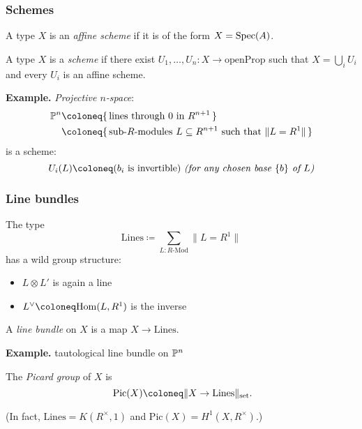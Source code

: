 \documentclass{beamer}
\begin{document}
\begin{frame}
  \frametitle{Schemes}

  A type $X$ is an \emph{affine scheme} if
  it is of the form $X = \operatorname{Spec}(A)$.

  \vspace{5mm}
  A type $X$ is a \emph{scheme} if
  there exist $U_1, \dots, U_n : X \to \mathrm{openProp}$
  such that $X = \bigcup_i U_i$
  and every $U_i$ is an affine scheme.

  \pause
  \vspace{5mm}
  \textbf{Example.}
  \emph{Projective $n$-space}:
  \begin{align*}
    \bP^n
    &\coloneq \{\,\text{lines through $0$ in $R^{n+1}$}\,\} \\
    &\coloneq \{\,\text{sub-$R$-modules $L \subseteq R^{n+1}$ such that $\lVert L = R^1 \rVert$}\,\}
  \end{align*}
  is a scheme:
  \[
    U_i(L) \coloneq \text{($b_i$ is invertible) \textit{(for any chosen base $\{b\}$ of $L$)}}
  \]
\end{frame}

\begin{frame}
  \frametitle{Line bundles}

  The type
  \[ \mathrm{Lines} \coloneq \sum_{L : R\text{-Mod}} \lVert L = R^1 \rVert \]
  has a wild group structure:
  \begin{itemize}
    \item
      $L \otimes L'$ is again a line
    \item
      $L^{\vee} \coloneq \Hom(L, R^1)$ is the inverse
  \end{itemize}

  \pause
  \vspace{5mm}
  A \emph{line bundle} on $X$ is a map $X \to \mathrm{Lines}$.

  \textbf{Example.}
  tautological line bundle on $\mathbb{P}^n$

  \pause
  \vspace{5mm}
  The \emph{Picard group} of $X$ is
  \[ \mathrm{Pic}(X) \coloneq \lVert X \to \mathrm{Lines} \rVert_{\text{set}} \rlap{.}\]

  \vspace{5mm}
  (In fact, $\mathrm{Lines} = K(R^{\times}, 1)$
  and $\mathrm{Pic}(X) = H^1(X, R^{\times})$.)
\end{frame}
\end{document}
